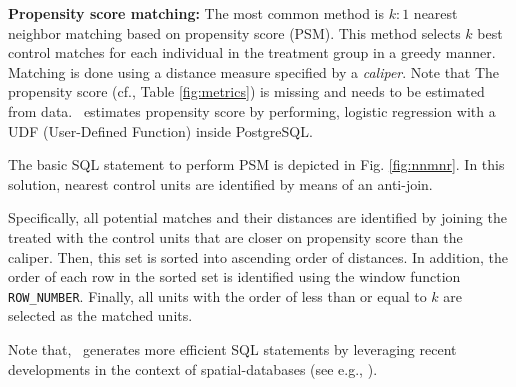 {\bf Propensity score matching:}
\label{sec:nnm}
The most common method is $k:1$ nearest neighbor
matching based on propensity score (PSM). This method selects $k$
best control matches for each individual
in the treatment group in a greedy manner. Matching is
done using a distance measure specified by a {\em caliper}. Note that The propensity score
(cf., Table \ref{fig:metrics}) is missing and needs to be estimated from data.
\GSQL\ estimates propensity score by performing, logistic regression with
 a UDF (User-Defined Function) inside PostgreSQL.

The basic SQL statement to perform PSM
is depicted in Fig. \ref{fig:nnmnr}.
In this solution,
nearest control units are identified
by means of an anti-join.  Specifically, all potential matches and their distances are identified by
joining the treated with the control units that are closer on propensity score than
the caliper. Then, this set is sorted into ascending order of
distances.  In addition, the order of each row in the sorted set is identified
using the window function {\verb|ROW_NUMBER|}. Finally, all units with the order of less than or equal to $k$ are selected as the matched units.

Note that, \GSQL\  generates more efficient SQL statements by
leveraging recent developments in the context of spatial-databases
(see e.g., \cite{obe2015postgis}).



